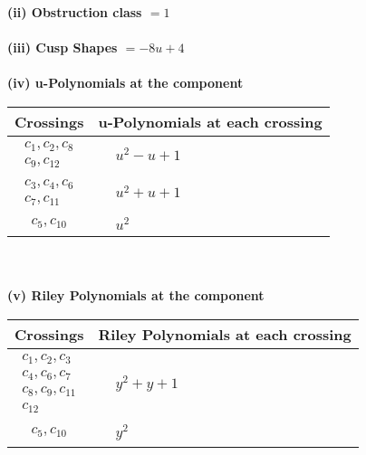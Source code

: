 \documentclass[1p]{elsarticle_modified}
\theoremstyle{definition}
\begin{document}
\flushleft \textbf{(ii) Obstruction class $= 1$}\\~\\
\flushleft \textbf{(iii) Cusp Shapes $= -8 u+4$}\\~\\
\newpage\renewcommand{\arraystretch}{1}
\flushleft \textbf{(iv) u-Polynomials at the component}\newline \\
\begin{tabular}{m{50pt}|m{274pt}}
Crossings & \hspace{64pt}u-Polynomials at each crossing \\
\hline $$\begin{aligned}c_{1},c_{2},c_{8}\\c_{9},c_{12}\end{aligned}$$&$\begin{aligned}
&u^2- u+1
\end{aligned}$\\
\hline $$\begin{aligned}c_{3},c_{4},c_{6}\\c_{7},c_{11}\end{aligned}$$&$\begin{aligned}
&u^2+u+1
\end{aligned}$\\
\hline $$\begin{aligned}c_{5},c_{10}\end{aligned}$$&$\begin{aligned}
&u^2
\end{aligned}$\\
\hline
\end{tabular}\\~\\
\newpage\renewcommand{\arraystretch}{1}
\flushleft \textbf{(v) Riley Polynomials at the component}\newline \\
\begin{tabular}{m{50pt}|m{274pt}}
Crossings & \hspace{64pt}Riley Polynomials at each crossing \\
\hline $$\begin{aligned}c_{1},c_{2},c_{3}\\c_{4},c_{6},c_{7}\\c_{8},c_{9},c_{11}\\c_{12}\end{aligned}$$&$\begin{aligned}
&y^2+y+1
\end{aligned}$\\
\hline $$\begin{aligned}c_{5},c_{10}\end{aligned}$$&$\begin{aligned}
&y^2
\end{aligned}$\\
\hline
\end{tabular}\\~\\
\end{document}

